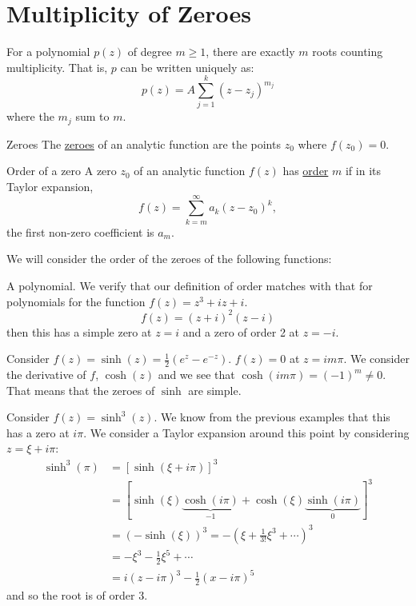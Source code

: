 \documentclass[../Main.tex]{subfiles}
\begin{document}
\section{Multiplicity of Zeroes}
\begin{theorem}
    For a polynomial $p(z)$ of degree $m \geq 1$, there are exactly $m$ roots counting multiplicity. That is, $p$ can be written uniquely as:
    \begin{equation*}
        p(z) = A\sum_{j=1}^{k} (z - z_j)^{m_j}
    \end{equation*}
    where the $m_j$ sum to $m$.
    \label{thmFundamentalAlgebra}
\end{theorem}
\begin{definition}{Zeroes}
    The \underline{zeroes} of an analytic function are the points $z_0$ where $f(z_0) = 0$.
\end{definition}
\begin{definition}{Order of a zero}
    A zero $z_0$ of an analytic function $f(z)$ has \underline{order} $m$ if in its Taylor expansion,
    \begin{equation*}
        f(z) = \sum_{k=m}^{\infty} a_k (z - z_0)^k,
    \end{equation*}
    the first non-zero coefficient is $a_m$.
\end{definition}
\begin{examples}{
        We will consider the order of the zeroes of the following functions:
    }
    \item A polynomial. We verify that our definition of order matches with that for polynomials for the function $f(z) = z^3 + iz + i$.
        \begin{equation*}
            f(z) = (z + i)^2 (z - i)
        \end{equation*}
        then this has a simple zero at $z = i$ and a zero of order 2 at $z = -i$.
    \item Consider $f(z) = \sinh(z) = \frac12(e^z - e^{-z})$. $f(z) = 0$ at $z = im\pi$. We consider the derivative of $f$, $\cosh(z)$ and we see that $\cosh(im\pi) = (-1)^m \neq 0$. That means that the zeroes of $\sinh$ are simple.
    \item Consider $f(z) = \sinh^3(z)$.
        We know from the previous examples that this has a zero at $i\pi$. We consider a Taylor expansion around this point by considering $z = \xi + i\pi$:
        \begin{align*}
            \sinh^3(\pi) &= \left[\sinh(\xi + i \pi)\right]^3 \\
            &= \left[\sinh(\xi) \underbrace{\cosh(i\pi)}_{-1} + \cosh(\xi) \underbrace{\sinh(i\pi)}_{0} \right]^3 \\
            &= (-\sinh(\xi))^3 = -\left(\xi + \frac{1}{3!}\xi^3 + \cdots\right)^3 \\
            &= -\xi^3 - \frac12 \xi^5 + \cdots \\
            &= i(z - i\pi)^3 -\frac12(x - i\pi)^5
        \end{align*}
        and so the root is of order 3.
\end{examples}
\end{document}
